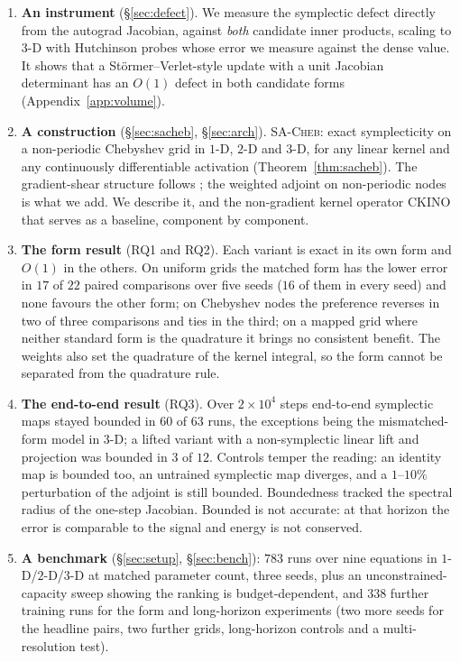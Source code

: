 \documentclass[11pt]{article}
\theoremstyle{definition}
\theoremstyle{remark}
\newcommand{\sacheb}{\textsc{SA-Cheb}}
\newcommand{\ckino}{\textsc{CKINO}}
\begin{document}
\label{sec:intro-claims}
\begin{enumerate}\itemsep2pt
\item \textbf{An instrument} (\S\ref{sec:defect}). We measure the symplectic
defect directly from the autograd Jacobian, against \emph{both} candidate inner
products, scaling to $3$-D with Hutchinson probes
\citep{hutchinson1990trace,avron2011trace} whose error we measure against the
dense value. It shows that a St\"ormer--Verlet-style update with a unit Jacobian
determinant has an $O(1)$ defect in both candidate forms
(Appendix~\ref{app:volume}).

\item \textbf{A construction} (\S\ref{sec:sacheb}, \S\ref{sec:arch}).
\sacheb{}: exact symplecticity on a non-periodic Chebyshev grid in $1$-D, $2$-D
and $3$-D, for any linear kernel and any continuously differentiable activation
(Theorem~\ref{thm:sacheb}). The gradient-shear structure follows
\citet{makara2026sno}; the weighted adjoint on non-periodic nodes is what we add.
We describe it, and the non-gradient kernel operator \ckino{} that serves as a
baseline, component by component.

\item \textbf{The form result} (RQ1 and RQ2). Each variant is exact in its own
form and $O(1)$ in the others. On uniform grids the matched form has the lower
error in $17$ of $22$ paired comparisons over five seeds ($16$ of them in every
seed) and none favours the other form; on Chebyshev nodes the preference
reverses in two of three comparisons and ties in the third; on a mapped grid
where neither standard form is the quadrature it brings no consistent benefit.
The weights also set the quadrature of the kernel integral, so the form cannot
be separated from the quadrature rule.

\item \textbf{The end-to-end result} (RQ3). Over $2\times10^{4}$ steps
end-to-end symplectic maps stayed bounded in $60$ of $63$ runs, the exceptions
being the mismatched-form model in $3$-D; a lifted variant with a
non-symplectic linear lift and projection was bounded in $3$ of $12$. Controls
temper the reading: an identity map is bounded too, an untrained symplectic map
diverges, and a $1$--$10\%$ perturbation of the adjoint is still bounded.
Boundedness tracked the spectral radius of the one-step Jacobian. Bounded is not
accurate: at that horizon the error is comparable to the signal and energy is
not conserved.

\item \textbf{A benchmark} (\S\ref{sec:setup}, \S\ref{sec:bench}): $783$ runs
over nine equations in $1$-D/$2$-D/$3$-D at matched parameter count, three
seeds, plus an unconstrained-capacity sweep showing the ranking is
budget-dependent, and $338$ further training runs for the form and
long-horizon experiments (two more seeds for the headline pairs, two further
grids, long-horizon controls and a multi-resolution test).
\end{enumerate}
\end{document}
